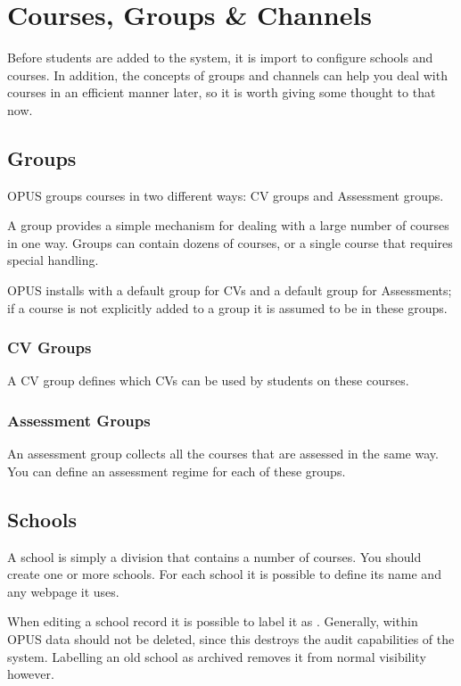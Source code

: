 \documentclass[12 pt]{book}
\begin{document}
\chapter{Courses, Groups \& Channels}

Before students are added to the system, it is import to configure schools and
courses. In addition, the concepts of groups and channels can help you deal
with courses in an efficient manner later, so it is worth giving some thought
to that now.

\section{Groups}

OPUS groups courses in two different ways: CV groups and Assessment groups.

A group provides a simple mechanism for dealing with a large number of courses
in one way. Groups can contain dozens of courses, or a single course that
requires special handling.

OPUS installs with a default group for CVs and a default group for Assessments;
if a course is not explicitly added to a group it is assumed to be in these
groups.

\subsection{CV Groups}
\label{CVGroups}

A CV group defines which CVs can be used by students on these courses.

\subsection{Assessment Groups}

An assessment group collects all the courses that are assessed in the same way.
You can define an assessment regime for each of these groups.

\section{Schools}

A school is simply a division that contains a number of courses. You should 
create one or more schools. For each school it is possible to define its name
and any webpage it uses.

When editing a school record it is possible to label it as . Generally,
within OPUS data should not be deleted, since this destroys the audit capabilities
of the system. Labelling an old school as archived removes it from normal visibility
however.
\end{document}
